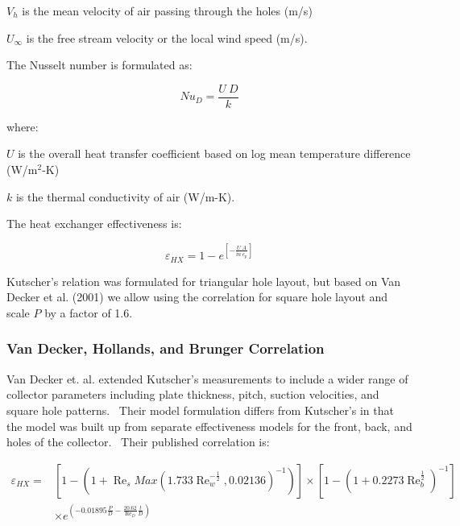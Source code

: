 \({V_h}\) is the mean velocity of air passing through the holes (m/s)

\({U_\infty }\) is the free stream velocity or the local wind speed (m/s).

The Nusselt number is formulated as:

\begin{equation}
N{u_D} = \frac{{U~D}}{k}
\end{equation}

where:

\(U\) is the overall heat transfer coefficient based on log mean temperature difference (W/m\(^{2}\)-K)

\(k\) is the thermal conductivity of air (W/m-K).

The heat exchanger effectiveness is:

\begin{equation}
{\varepsilon_{HX}} = 1 - {e^{\left[ { - \frac{{U~A}}{{\dot m~{c_p}}}} \right]}}
\end{equation}

Kutscher's relation was formulated for triangular hole layout, but based on Van Decker et al. (2001) we allow using the correlation for square hole layout and scale \(P\) by a factor of 1.6.

\subsubsection{Van Decker, Hollands, and Brunger Correlation}\label{van-decker-hollands-and-brunger-correlation}

Van Decker et. al. extended Kutscher's measurements to include a wider range of collector parameters including plate thickness, pitch, suction velocities, and square hole patterns.~ Their model formulation differs from Kutscher's in that the model was built up from separate effectiveness models for the front, back, and holes of the collector.~ Their published correlation is:

\begin{equation}
\begin{split}
{\varepsilon_{HX}} =& \left[ {1 - \left( {1 + {{\operatorname{Re} }_s}Max{{\left( {1.733\operatorname{Re}_w^{ - {\frac{1}{2}}},0.02136} \right)}^{ - 1}}} \right)} \right] \times \left[ {1 - {{\left( {1 + 0.2273\operatorname{Re}_b^{{\frac{1}{2}}}} \right)}^{ - 1}}} \right] \\
&\times {e^{\left( { - 0.01895\frac{P}{D} - \frac{{20.62}}{{{{\operatorname{Re} }_D}}}\frac{t}{D}} \right)}}
\end{split}
\end{equation}

